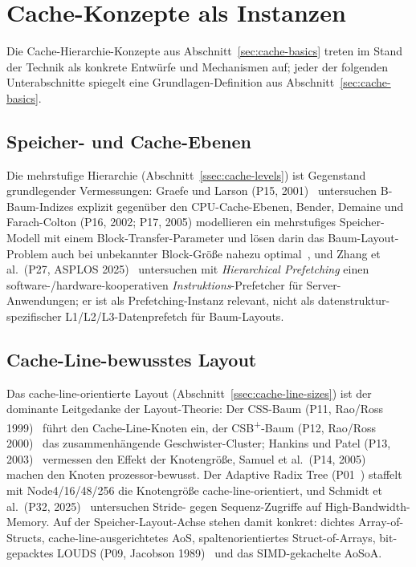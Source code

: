 \section{Cache-Konzepte als Instanzen}\label{sec:sota-cache}
Die Cache-Hierarchie-Konzepte aus Abschnitt~\ref{sec:cache-basics} treten im Stand der Technik als
konkrete Entwürfe und Mechanismen auf; jeder der folgenden Unterabschnitte spiegelt eine
Grundlagen-Definition aus Abschnitt~\ref{sec:cache-basics}.

\subsection{Speicher- und Cache-Ebenen}\label{ssec:sota-levels}
Die mehrstufige Hierarchie (Abschnitt~\ref{ssec:cache-levels}) ist Gegenstand grundlegender
Vermessungen: Graefe und Larson (P15, 2001)~\cite{graefe2001btree} untersuchen B-Baum-Indizes
explizit gegenüber den CPU-Cache-Ebenen, Bender, Demaine und Farach-Colton (P16, 2002; P17, 2005)
modellieren ein mehrstufiges Speicher-Modell mit einem Block-Transfer-Parameter und lösen darin das
Baum-Layout-Problem auch bei unbekannter Block-Größe nahezu optimal~\cite{bender2002treelayout}, und
Zhang et al.\ (P27, ASPLOS 2025)~\cite{zhang2025hierarchical} untersuchen mit
\emph{Hierarchical Prefetching} einen software-/hardware-kooperativen \emph{Instruktions}-Prefetcher
für Server-Anwendungen; er ist als Prefetching-Instanz relevant, nicht als
datenstruktur-spezifischer L1/L2/L3-Datenprefetch für Baum-Layouts.

\subsection{Cache-Line-bewusstes Layout}\label{ssec:sota-cacheline}
Das cache-line-orientierte Layout (Abschnitt~\ref{ssec:cache-line-sizes}) ist der dominante
Leitgedanke der Layout-Theorie: Der CSS-Baum (P11, Rao/Ross 1999)~\cite{rao1999css} führt den
Cache-Line-Knoten ein, der CSB\textsuperscript{+}-Baum (P12, Rao/Ross 2000)~\cite{rao2000csb} das
zusammenhängende Geschwister-Cluster; Hankins und Patel (P13, 2003)~\cite{hankins2003nodesize}
vermessen den Effekt der Knotengröße, Samuel et al.\ (P14, 2005)~\cite{samuel2005procaware} machen
den Knoten prozessor-bewusst. Der Adaptive Radix Tree (P01~\cite{leis2013art}) staffelt mit
Node4/16/48/256 die Knotengröße cache-line-orientiert, und Schmidt et al.\ (P32,
2025)~\cite{schmidt2025hbm} untersuchen Stride- gegen Sequenz-Zugriffe auf High-Bandwidth-Memory.
Auf der Speicher-Layout-Achse stehen damit konkret: dichtes Array-of-Structs,
cache-line-ausgerichtetes AoS, spaltenorientiertes Struct-of-Arrays, bit-gepacktes LOUDS (P09,
Jacobson 1989)~\cite{jacobson1989louds} und das SIMD-gekachelte AoSoA.

